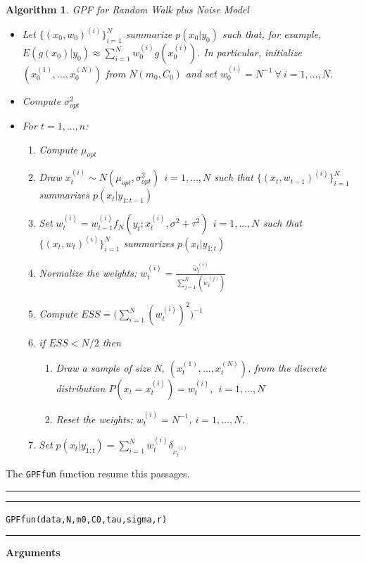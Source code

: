 \documentclass[
]{book}
\theoremstyle{break}
\theoremstyle{nonumberplain}
\newtheorem{algorithm}{Algorithm}[section]
\begin{document}
\begin{algorithm} GPF for Random Walk plus Noise Model
\begin{itemize}
\item Let $\{(x_{0},w_{0})^{(i)}\}_{i=1}^{N}$ summarize $p(x_{0}|y_{0})$ such that, for example, $E(g(x_{0})|y_{0}) \approx \sum_{i=1}^{N}w_{0}^{(i)}g(x_{0}^{(i)})$. In particular, initialize $(x_{0}^{(1)},...,x_{0}^{(N)})$ from $N(m_{0},C_{0})$ and set $w_{0}^{(i)}=N^{-1} \ \forall \ i=1,...,N$.
\item Compute $\sigma_{opt}^{2}$ 
\item For $t=1,...,n$:
\begin{enumerate}
\item Compute $\mu_{opt}$
\item Draw $x_{t}^{(i)} \sim N(\mu_{opt},\sigma_{opt}^{2}) \ \ i=1,...,N$ such that $\{(x_{t},w_{t-1})^{(i)}\}_{i=1}^{N}$ summarizes $p(x_{t}|y_{1:t-1})$
\item Set $w_{t}^{(i)} = w_{t-1}^{(i)}f_{N}(y_{t};x_{t}^{(i)},\sigma^2+\tau^{2}) \ \ i=1,...,N$ such that $\{(x_{t},w_{t})^{(i)}\}_{i=1}^{N}$ summarizes $p(x_{t}|y_{1:t})$
\item Normalize the weights: $w_{t}^{(i)}=\frac{\tilde{w}_{t}^{(i)}}{\sum_{j=1}^{N}(\tilde{w}_{t}^{(j)})}$
\item Compute $ESS=\Bigg(\sum_{i=1}^{N}(w_{t}^{(i)})^{2}\Bigg)^{-1}$
\item if $ESS<N/2$ then
\begin{enumerate}
\item Draw a sample of size N, $(x_{t}^{(1)},...,x_{t}^{(N)})$, from the discrete distribution $P(x_{t}=x_{t}^{(i)})=w_{t}^{(i)},\ \ i=1,...,N$
\item Reset the weights: $w_{t}^{(i)}=N^{-1}$, $i=1,...,N$.
\end{enumerate}
\item Set $p(x_{t}|y_{1:t})=\sum_{i=1}^{N}w_{t}^{(i)}\delta_{x_{t}^{(i)}}$
\end{enumerate}
\end{itemize}
\end{algorithm}

The \texttt{GPFfun} function resume this passages.\\

\hrule
\hrule

\texttt{GPFfun(data,N,m0,C0,tau,sigma,r)}\\

\hrule

\textbf{Arguments}
\end{document}
